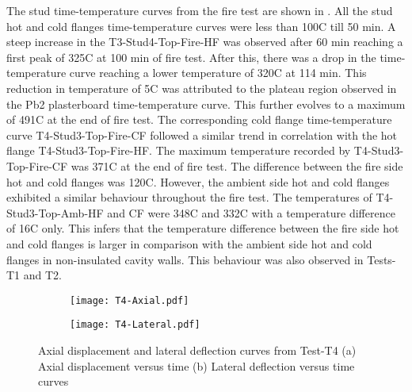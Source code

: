 The stud time-temperature curves from the fire test are shown in . All the stud hot and cold flanges time-temperature curves were less than 100\degree C till 50 min. A steep increase in the T3-Stud4-Top-Fire-HF was observed after 60 min reaching a first peak of 325\degree C at 100 min of fire test. After this, there was a drop in the time-temperature curve reaching a lower temperature of 320\degree C at 114 min. This reduction in temperature of 5\degree C was attributed to the plateau region observed in the Pb2 plasterboard time-temperature curve. This further evolves to a maximum of 491\degree C at the end of fire test. The corresponding cold flange time-temperature curve T4-Stud3-Top-Fire-CF followed a similar trend in correlation with the hot flange T4-Stud3-Top-Fire-HF. The maximum temperature recorded by T4-Stud3-Top-Fire-CF was 371\degree C at the end of fire test. The difference between the fire side hot and cold flanges was 120\degree C. However, the ambient side hot and cold flanges exhibited a similar behaviour throughout the fire test. The temperatures of T4-Stud3-Top-Amb-HF and CF were 348\degree C and 332\degree C with a temperature difference of 16\degree C only. This infers that the temperature difference between the fire side hot and cold flanges is larger in comparison with the ambient side hot and cold flanges in non-insulated cavity walls. This behaviour was also observed in Tests-T1 and T2.
\begin{figure}[!htbp]
	\centering
	\begin{subfigure}[b]{0.7\textwidth}
		\centering
		\texttt{[image: T4-Axial.pdf]}
		\caption{}
		\label{subfig:T4-Axial}
	\end{subfigure}
	\begin{subfigure}[b]{0.7\textwidth}
		\centering
		\texttt{[image: T4-Lateral.pdf]}
		\caption{}
		\label{subfig:T4-Lateral}
	\end{subfigure}
	   \caption{Axial displacement and lateral deflection curves from Test-T4 (a) Axial displacement versus time (b) Lateral deflection versus time curves}
	   \label{fig:T4-Axial-Lateral}
\end{figure}

